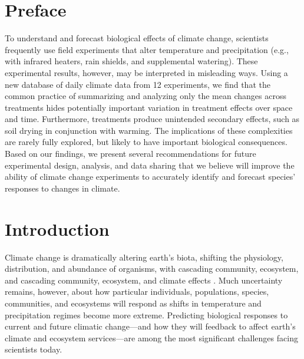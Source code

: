 \documentclass{article}
\begin{document}
\section* {Preface} 
\par To understand and forecast biological effects of climate change, scientists frequently use field experiments that alter temperature and precipitation (e.g., with infrared heaters, rain shields, and supplemental watering). These experimental results, however, may be interpreted in misleading ways. Using a new database of daily climate data from 12 experiments, we find that the common practice of summarizing and analyzing only the mean changes across treatments hides potentially important variation in treatment effects over space and time. Furthermore, treatments produce unintended secondary effects, such as soil drying in conjunction with warming. The implications of these complexities are rarely fully explored, but likely to have important biological consequences. Based on our findings, we present several recommendations for future experimental design, analysis, and data sharing that we believe will improve the ability of climate change experiments to accurately identify and forecast species' responses to changes in climate.
\section* {Introduction}
\par Climate change is dramatically altering earth's biota, shifting the physiology, distribution, and abundance of organisms, with cascading community, ecosystem, and cascading community, ecosystem, and climate effects \citep{shukla1982,cox2000,thomas2004,parmesan2006,field2007,sheldon2011,urban2012}.
Much uncertainty remains, however, about how particular individuals, populations, species, communities, and ecosystems will respond as shifts in temperature and precipitation regimes become more extreme. Predicting biological responses to current and future climatic change---and how they will feedback to affect earth's climate and ecosystem services---are among the most significant challenges facing scientists today.
\end{document}

